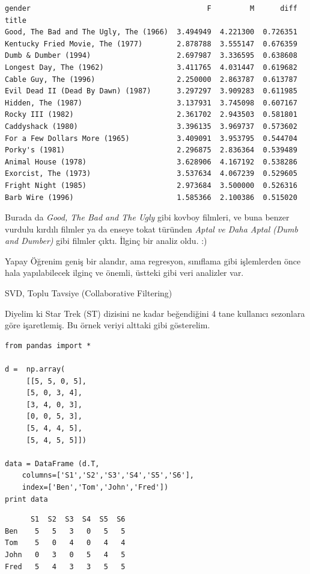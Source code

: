 \documentclass[12pt,fleqn]{article}\usepackage{../../common}
\begin{document}
\begin{verbatim}
gender                                         F         M      diff
title                                                               
Good, The Bad and The Ugly, The (1966)  3.494949  4.221300  0.726351
Kentucky Fried Movie, The (1977)        2.878788  3.555147  0.676359
Dumb & Dumber (1994)                    2.697987  3.336595  0.638608
Longest Day, The (1962)                 3.411765  4.031447  0.619682
Cable Guy, The (1996)                   2.250000  2.863787  0.613787
Evil Dead II (Dead By Dawn) (1987)      3.297297  3.909283  0.611985
Hidden, The (1987)                      3.137931  3.745098  0.607167
Rocky III (1982)                        2.361702  2.943503  0.581801
Caddyshack (1980)                       3.396135  3.969737  0.573602
For a Few Dollars More (1965)           3.409091  3.953795  0.544704
Porky's (1981)                          2.296875  2.836364  0.539489
Animal House (1978)                     3.628906  4.167192  0.538286
Exorcist, The (1973)                    3.537634  4.067239  0.529605
Fright Night (1985)                     2.973684  3.500000  0.526316
Barb Wire (1996)                        1.585366  2.100386  0.515020
\end{verbatim}

Burada da {\em Good, The Bad and The Ugly} gibi kovboy filmleri, ve buna
benzer vurdulu kırdılı filmler ya da enseye tokat türünden 
{\em Aptal ve Daha Aptal (Dumb and Dumber)} gibi filmler çıktı. İlginç 
bir analiz oldu. :)

Yapay Öğrenim geniş bir alandır, ama regresyon, sınıflama gibi işlemlerden
önce hala yapılabilecek ilginç ve önemli, üstteki gibi veri analizler var.

SVD, Toplu Tavsiye (Collaborative Filtering) 

Diyelim ki Star Trek (ST) dizisini ne kadar beğendiğini 4 tane
kullanıcı sezonlara göre işaretlemiş. Bu örnek veriyi alttaki gibi
gösterelim.

\begin{verbatim}
from pandas import *

d =  np.array(
     [[5, 5, 0, 5],
     [5, 0, 3, 4],
     [3, 4, 0, 3],
     [0, 0, 5, 3],
     [5, 4, 4, 5],
     [5, 4, 5, 5]])

data = DataFrame (d.T,
    columns=['S1','S2','S3','S4','S5','S6'],
    index=['Ben','Tom','John','Fred'])
print data
\end{verbatim}

\begin{verbatim}
      S1  S2  S3  S4  S5  S6
Ben    5   5   3   0   5   5
Tom    5   0   4   0   4   4
John   0   3   0   5   4   5
Fred   5   4   3   3   5   5
\end{verbatim}
\end{document}
